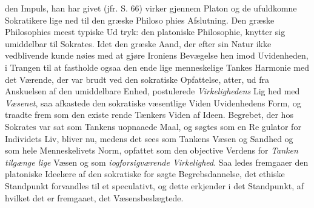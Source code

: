 \documentclass[12pt,a4paper]{book}
\begin{document}
den Impuls, han har givet (jfr. S. 66) virker gjennem Platon
og de ufuldkomne Sokratikere lige ned til den græske Philoso\-%
phies Afslutning. Den græske Philosophies meest typiske Ud\-%
tryk: den platoniske Philosophie, knytter sig umiddelbar til
Sokrates. Idet den græske Aand, der efter sin Natur ikke
vedblivende kunde nøies med at gjøre Ironiens Bevægelse hen\-%
imod Uvidenheden, i Trangen til at fastholde ogsaa den ende\-%
lige menneskelige Tankes Harmonie med det Værende, der var
brudt ved den sokratiske Opfattelse, atter, ud fra Anskuelsen
af den umiddelbare Enhed, postulerede \emph{Virkelighedens} Lig\-%
hed med \emph{Væsenet}, saa afkastede den sokratiske væsentlige
Viden Uvidenhedens Form, og traadte frem som den existe\-%
rende Tænkers Viden af Ideen. Begrebet, der hos Sokrates
var sat som Tankens uopnaaede Maal, og søgtes som en Re\-%
gulator for Individets Liv, bliver nu, medens det sees som
Tankens Væsen og Sandhed og som hele Menneskelivets Norm,
opfattet som den objective Verdens for \emph{Tanken tilgænge\-%
lige} Væsen og som \emph{iogforsigværende Virkelighed}. Saa\-%
ledes fremgaaer den platoniske Ideelære af den sokratiske for\-%
søgte Begrebsdannelse, det ethiske Standpunkt forvandles til
et speculativt, og dette erkjender i det Standpunkt, af hvilket
det er fremgaaet, det Væsensbeslægtede.
%
\end{document}
